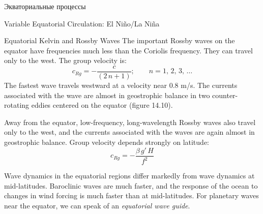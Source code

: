 \begin{chapter}{Экваториальные процессы}
\begin{section}{Variable Equatorial Circulation: El Ni\~{n}o/La Ni\~{n}a}
\begin{paragraph}{Equatorial Kelvin and Rossby Waves}
The important Rossby waves on the equator have
frequencies much less than the Coriolis frequency. They can travel
only to the west. The group velocity is:
\begin{equation}
 c_{Rg} = - \frac{c}{\left(2\,n+1\right)}; \qquad n=1,\,2,\,3,\,\ldots
\end{equation}
The fastest wave travels westward at a velocity near 0.8 m/s. The
currents associated with the wave are almost in geostrophic
balance in two
counter-rotating eddies centered on the equator (figure 14.10).
%

Away from the equator, low-frequency, long-wavelength
Rossby waves also travel only to the west, and the
currents associated with the waves are again almost in geostrophic
balance. Group velocity depends strongly on latitude:
\begin{equation}
 c_{Rg} = -\frac{\beta\,g'\,H}{f^2}
\end{equation}
%

Wave dynamics in the equatorial regions differ markedly from wave
dynamics at mid-latitudes. Baroclinic waves are much faster, and the
response of the ocean to changes in wind forcing is much faster than
at mid-latitudes. For planetary waves near the equator, we can speak
of an \textit{equatorial wave guide}.
%
%


\end{paragraph}
\end{section}
\end{chapter}
